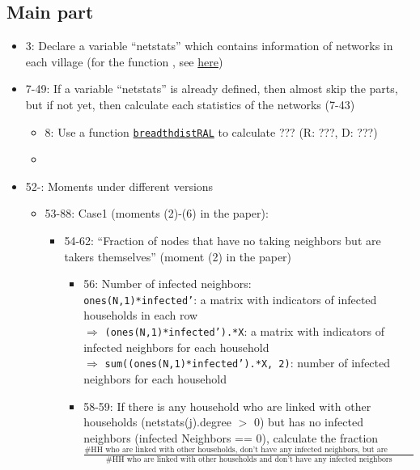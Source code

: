 \documentclass[10pt,letterpaper]{article}
\begin{document}
\subsection*{Main part}
\begin{itemize}
  \item 3: Declare a variable ``netstats'' which contains information of networks in each village (for the function , see \href{https://www.mathworks.com/help/matlab/ref/persistent.html}{here})
  \item 7-49: If a variable ``netstats'' is already defined, then almost skip the parts, but if not yet, then calculate each statistics of the networks (7-43)
    \begin{itemize}
      \item 8: Use a function \hyperref[breadthdistRAL]{\texttt{breadthdistRAL}} to calculate ??? (R: ???, D: ???)
      \item 
    \end{itemize}
  \item 52-: Moments under different versions
    \begin{itemize}
      \item 53-88: Case1 (moments (2)-(6) in the paper):
        \begin{itemize}
          \item 54-62: ``Fraction of nodes that have no taking neighbors but are takers themselves'' (moment (2) in the paper)
            \begin{itemize}
              \item 56: Number of infected neighbors: \\
                \texttt{ones(N,1)*infected'}: a matrix with indicators of infected households in each row \\
                $\Rightarrow$ \texttt{(ones(N,1)*infected').*X}: a matrix with indicators of infected neighbors for each household \\
                $\Rightarrow$ \texttt{sum((ones(N,1)*infected').*X, 2)}: number of infected neighbors for each household
              \item 58-59: If there is any household who are linked with other households (netstats(j).degree $>$ 0) but has no infected neighbors (infected Neighbors == 0), 
                calculate the fraction $\frac{\text{\# HH who are linked with other households, don't have any infected neighbors, but are infected themselves}}{\text{\# HH who are linked with other households and don't have any infected neighbors}}$

\end{itemize}
\end{itemize}
\end{itemize}
\end{itemize}
\end{document}
